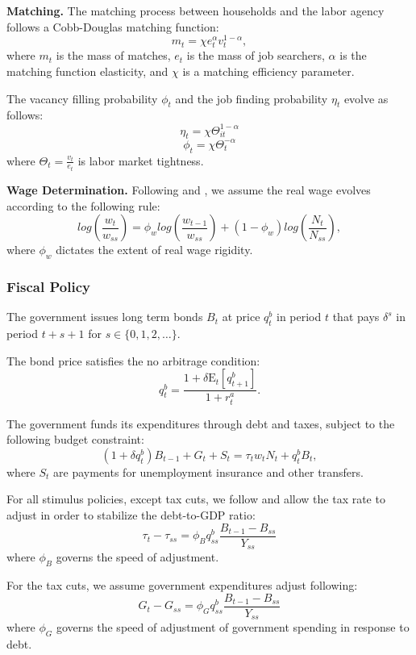 \textbf{Matching.} The matching process between households and the labor agency follows a Cobb-Douglas matching function:
$$m_{t} = \chi e_{t}^{\alpha} v_{t}^{1-\alpha},$$ 
where $m_{t}$ is the mass of matches, $e_{t}$ is the mass of job searchers, $\alpha$ is the matching function elasticity, and $\chi$ is a matching efficiency parameter.

The vacancy filling probability \( \phi_t \) and the job finding probability \( \eta_t \) evolve as follows:
$$\eta_{t} = \chi \Theta_{it}^{1-\alpha} $$
$$ \phi_{t} = \chi \Theta_{t}^{-\alpha} $$ 
where $\Theta_{t} = \frac{v_{t}}{e_{t}}$ is labor market tightness.

\textbf{Wage Determination.} Following \cite{Gornemann2021} and \cite{Blanchard2010}, we assume the real wage evolves according to the following rule:
$$log\left(\frac{w_{t}}{w_{ss}}\right)  = \phi_w log\left( \frac{ w_{t-1}}{ w_{ss}} \right) +   (1 - \phi_w) log\left( \frac{N_{t}}{N_{ss}}\right),$$
where $\phi_w$ dictates the extent of real wage rigidity. 

\subsubsection{Fiscal Policy}

The government issues long term bonds $B_{t}$ at price $q^{b}_{t}$ in period $t$ that pays $\delta^{s}$ in period $t+s+1$ for $s \in \{0,1,2,\ldots\}$.

The bond price satisfies the no arbitrage condition:
$$q^{b}_{t} = \frac{ 1  + \delta \mathrm{E}_{t}[q^{b}_{t+1}]}{1+r^{a}_{t}}.$$ 

The government funds its expenditures through debt and taxes, subject to the following budget constraint:
$$ (1 + \delta q^{b}_{t})B_{t-1} + G_{t}  + S_{t} = \tau_{t} w_{t} N_{t}+ q^{b}_{t}B_{t},$$
where $S_{t}$ are payments for unemployment insurance and other transfers.

For all stimulus policies, except tax cuts, we follow \cite{Auclert2020} and allow the tax rate to adjust in order to stabilize the debt-to-GDP ratio:
$$\tau_{t} - \tau_{ss} = \phi_{B} q^{b}_{ss} \frac{B_{t-1} - B_{ss} }{Y_{ss}}$$
where $\phi_{B}$ governs the speed of adjustment. 

For the tax cuts, we assume government expenditures adjust following:
$$G_{t} - G_{ss} = \phi_{G} q^{b}_{ss} \frac{B_{t-1} - B_{ss} }{Y_{ss}}$$
where $\phi_{G}$ governs the speed of adjustment of government spending in response to debt. 

